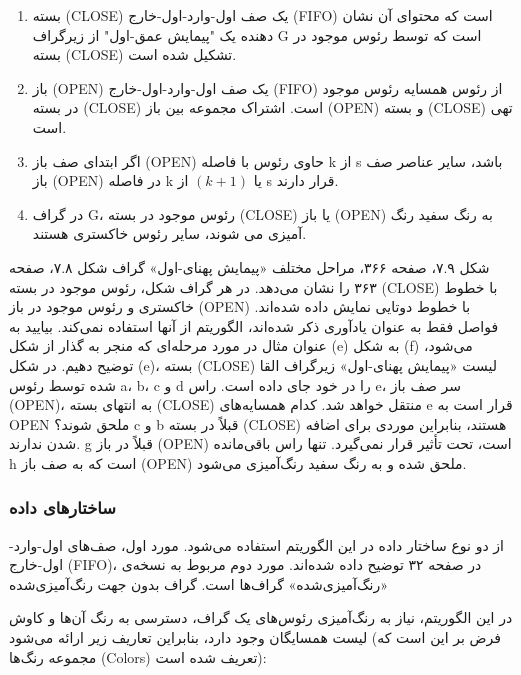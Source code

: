 \documentclass{book} %
\begin{document}
\begin{enumerate}
    \item  بسته (CLOSE) یک صف اول-وارد-اول-خارج (FIFO) است که محتوای آن نشان دهنده یک "پیمایش عمق-اول" از زیرگراف G است که توسط رئوس موجود در بسته (CLOSE) تشکیل شده است.
    
    \item  باز (OPEN) یک صف اول-وارد-اول-خارج (FIFO) از رئوس همسایه رئوس موجود در بسته (CLOSE) است. اشتراک مجموعه بین باز (OPEN) و بسته (CLOSE) تهی است.

    \item اگر ابتدای صف باز (OPEN) حاوی رئوس با فاصله k از s باشد، سایر عناصر صف باز (OPEN) در فاصله k یا $(k + 1)$ از s قرار دارند.

    \item در گراف G، رئوس موجود در بسته (CLOSE) یا باز (OPEN) به رنگ سفید رنگ آمیزی می شوند، سایر رئوس خاکستری هستند.
\end{enumerate}
\newpage

شکل ۷.۹، صفحه ۳۶۶، مراحل مختلف «پیمایش پهنای-اول» گراف شکل ۷.۸، صفحه ۳۶۳ را نشان می‌دهد. در هر گراف شکل، رئوس موجود در بسته (CLOSE) با خطوط خاکستری و رئوس موجود در باز (OPEN) با خطوط دوتایی نمایش داده شده‌اند. فواصل فقط به عنوان یادآوری ذکر شده‌اند، الگوریتم از آنها استفاده نمی‌کند. بیایید به عنوان مثال در مورد مرحله‌ای که منجر به گذار از شکل (e) به شکل (f) می‌شود، توضیح دهیم. در شکل (e)، بسته (CLOSE) لیست «پیمایش پهنای-اول» زیرگراف القا شده توسط رئوس a، b، c و d را در خود جای داده است. راس e، سر صف باز (OPEN)، به انتهای بسته (CLOSE) منتقل خواهد شد. کدام همسایه‌های e قرار است به OPEN ملحق شوند؟ c و b قبلاً در بسته (CLOSE) هستند، بنابراین موردی برای اضافه شدن ندارند. g  قبلاً در  باز (OPEN) است، تحت تأثیر قرار نمی‌گیرد. تنها راس باقی‌مانده h است که به صف باز (OPEN) ملحق شده و به رنگ سفید رنگ‌آمیزی می‌شود.

\subsubsection*{ساختارهای داده}

از دو نوع ساختار داده در این الگوریتم استفاده می‌شود. مورد اول، صف‌های اول-وارد-اول-خارج (FIFO)، در صفحه ۳۲ توضیح داده شده‌اند. مورد دوم مربوط به نسخه‌ی «رنگ‌آمیزی‌شده» گراف‌ها است.
گراف بدون جهت رنگ‌آمیزی‌شده

در این الگوریتم، نیاز به رنگ‌آمیزی رئوس‌های یک گراف، دسترسی به رنگ آن‌ها و کاوش لیست همسایگان وجود دارد، بنابراین تعاریف زیر ارائه می‌شود (فرض بر این است که مجموعه رنگ‌ها (Colors) تعریف شده است):
\end{document}
